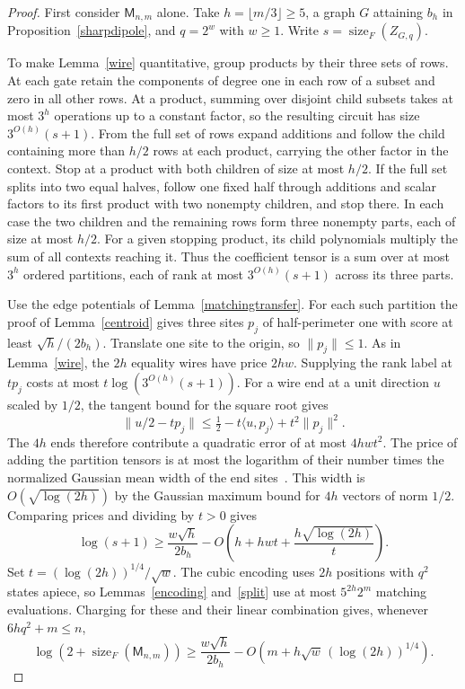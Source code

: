 \documentclass[11pt]{article}
\theoremstyle{remark}
\newcommand{\Match}{\mathsf M}
\newcommand{\sizeF}{\operatorname{size}_F}
\begin{document}
\begin{proof}
First consider $\Match_{n,m}$ alone. Take $h=\lfloor m/3\rfloor\ge5$, a graph $G$ attaining $b_h$ in Proposition~\ref{sharpdipole}, and $q=2^w$ with $w\ge1$. Write $s=\sizeF(Z_{G,q})$.

To make Lemma~\ref{wire} quantitative, group products by their three sets of rows.
At each gate retain the components of degree one in each row of a subset and zero in all other rows. At a product, summing over disjoint child subsets takes at most $3^h$ operations up to a constant factor, so the resulting circuit has size $3^{O(h)}(s+1)$. From the full set of rows expand additions and follow the child containing more than $h/2$ rows at each product, carrying the other factor in the context. Stop at a product with both children of size at most $h/2$. If the full set splits into two equal halves, follow one fixed half through additions and scalar factors to its first product with two nonempty children, and stop there. In each case the two children and the remaining rows form three nonempty parts, each of size at most $h/2$. For a given stopping product, its child polynomials multiply the sum of all contexts reaching it. Thus the coefficient tensor is a sum over at most $3^h$ ordered partitions, each of rank at most $3^{O(h)}(s+1)$ across its three parts.

Use the edge potentials of Lemma~\ref{matchingtransfer}. For each such partition the proof of Lemma~\ref{centroid} gives three sites $p_j$ of half-perimeter one with score at least $\sqrt h/(2b_h)$. Translate one site to the origin, so $\|p_j\|\le1$. As in Lemma~\ref{wire}, the $2h$ equality wires have price $2hw$. Supplying the rank label at $t p_j$ costs at most $t\log(3^{O(h)}(s+1))$. For a wire end at a unit direction $u$ scaled by $1/2$, the tangent bound for the square root gives
\[
 \|u/2-tp_j\|\le \tfrac12-t\langle u,p_j\rangle+t^2\|p_j\|^2 .
\]
The $4h$ ends therefore contribute a quadratic error of at most $4hwt^2$.
The price of adding the partition tensors is at most the logarithm of their number times the normalized Gaussian mean width of the end sites~\cite{euclid}. This width is $O(\sqrt{\log(2h)})$ by the Gaussian maximum bound for $4h$ vectors of norm $1/2$. Comparing prices and dividing by $t>0$ gives
\[
 \log(s+1)\ge \frac{w\sqrt h}{2b_h}
       -O\!\left(h+hwt+\frac{h\sqrt{\log(2h)}}{t}\right).
\]
Set $t=(\log(2h))^{1/4}/\sqrt w$. The cubic encoding uses $2h$ positions with $q^2$ states apiece, so Lemmas~\ref{encoding} and~\ref{split} use at most $5^{2h}2^m$ matching evaluations. Charging for these and their linear combination gives, whenever $6hq^2+m\le n$,
\begin{equation}\label{finite-matching}
 \log(2+\sizeF(\Match_{n,m}))\ge \frac{w\sqrt h}{2b_h}
           -O\!\left(m+h\sqrt w\,(\log(2h))^{1/4}\right).
\end{equation}


\end{proof}
\end{document}
